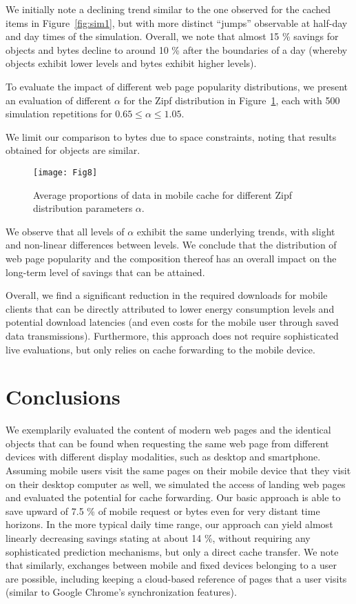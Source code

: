We initially note a declining trend similar to the one observed for the cached items in Figure~\ref{fig:sim1}, but with more distinct ``jumps'' observable at half-day and day times of the simulation.
Overall, we note that almost 15 \% savings for objects and bytes decline to around 10 \% after the boundaries of a day (whereby objects exhibit lower levels and bytes exhibit higher levels).

To evaluate the impact of different web page popularity distributions, we present an evaluation of different $\alpha$ for the Zipf distribution in Figure~\ref{fig:sim3}, each with 500 simulation repetitions for $0.65 \le \alpha \le 1.05$.

We limit our comparison to bytes due to space constraints, noting that results obtained for objects are similar.
\begin{figure}[]
	\centering
	\texttt{[image: Fig8]}
	\caption{Average proportions of data in mobile cache for different Zipf distribution parameters $\alpha$.}
	\label{fig:sim3}
\end{figure}
We observe that all levels of $\alpha$ exhibit the same underlying trends, with slight and non-linear differences between levels.
We conclude that the distribution of web page popularity and the composition thereof has an overall impact on the long-term level of savings that can be attained.

Overall, we find a significant reduction in the required downloads for mobile clients that can be directly attributed to lower energy consumption levels and potential download latencies (and even costs for the mobile user through saved data transmissions).
Furthermore, this approach does not require sophisticated live evaluations, but only relies on cache forwarding to the mobile device.

\section*{Conclusions}
\label{s:conc}
We exemplarily evaluated the content of modern web pages and the identical objects that can be found when requesting the same web page from different devices with different display modalities, such as desktop and smartphone.
Assuming mobile users visit the same pages on their mobile device that they visit on their desktop computer as well, we simulated the access of landing web pages and evaluated the potential for cache forwarding.
Our basic approach is able to save upward of 7.5 \% of mobile request or bytes even for very distant time horizons.
In the more typical daily time range, our approach can yield almost linearly decreasing savings stating at about 14 \%, without requiring any sophisticated prediction mechanisms, but only a direct cache transfer.
We note that similarly, exchanges between mobile and fixed devices belonging to a user are possible, including keeping a cloud-based reference of pages that a user visits (similar to Google Chrome's synchronization features). 